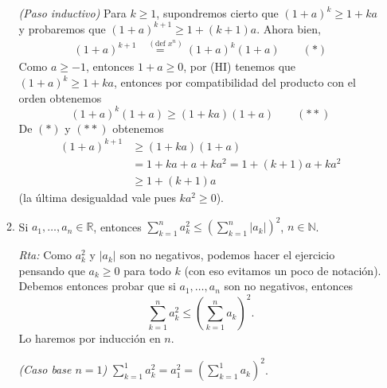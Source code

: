 \documentclass[a4paper,12pt,twoside,spanish,reqno]{amsbook}
\numberwithin{equation}{section}
\newcommand{\rta}{\noindent\textit{Rta: }}
\begin{document}
\begin{enumerate}[resume]
\begin{enumerate}
                \textit{(Paso inductivo) }  Para  $k \ge 1$,  supondremos cierto que $(1+a)^k\geq 1+k a$ y probaremos  que $(1+a)^{k+1}\geq 1+(k+1) a$. Ahora bien, 
                \begin{align*}
                (1+a)^{k+1} &\overset{(\text{def } x^n)}{=\quad} (1+a)^k(1+a) \qquad (*)
                \end{align*}
                Como $a\ge -1$, entonces $1+a \ge 0$, por (HI) tenemos  que $(1+a)^k\geq 1+k a$, entonces  por compatibilidad del  producto con el orden obtenemos
                \begin{equation*}
                    (1+a)^k(1+a) \ge   (1+k a)(1+a)  \qquad (**)
                \end{equation*}
                De $(*)$ y $(**)$ obtenemos
                \begin{align*}
                (1+a)^{k+1} &\ge (1+k a)(1+a) \\
                &= 1+ ka + a + ka^2 = 1 + (k+1)a + ka^2 \\
                &\ge 1 + (k+1)a
                \end{align*}
                (la última desigualdad vale pues $ka^2 \ge 0$). 
                
                
                \item Si $a_1,\dots,a_n \in \mathbb R$, entonces $\displaystyle{\sum_{k=1}^n a_{k}^{2}\leq \left(\sum_{k=1}^n |a_{k}|\right)^{2}}$, $n\in \mathbb N$.
                
                \rta Como $a_k^2$ y $|a_k|$ son no negativos, podemos hacer el ejercicio pensando que $a_k \ge 0$ para todo $k$ (con eso evitamos un poco de notación). Debemos entonces probar que  si $a_1,\dots,a_n $ son no negativos, entonces
                \begin{equation*}
                    \sum_{k=1}^n a_{k}^{2}\leq \left(\sum_{k=1}^n a_{k}\right)^{2}. 
                \end{equation*} 
                Lo haremos por inducción en $n$.
                 
                \textit{(Caso base $n=1$) } $\sum_{k=1}^1 a_{k}^{2} = a_1^2 = (\sum_{k=1}^1 a_{k})^{2}$.
                

\end{enumerate}
\end{enumerate}
\end{document}
